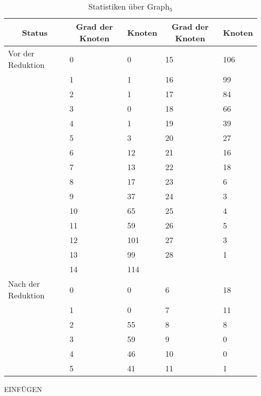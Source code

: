 \begin{table}[htb]
\caption{Statistiken über Graph$_{5}$\label{tab:graph4}}
\vspace*{1em}
\centering

\bgroup
\def\arraystretch{1.3}%

\begin{threeparttable}

\begin{tabular}[c]{ l | l | l | | l | l}
	
	\multicolumn{1}{c|}{\textbf{Status}} & 
	\multicolumn{1}{c|}{\textbf{Grad der Knoten}} & 
	\multicolumn{1}{c||}{\textbf{Knoten}} &
	\multicolumn{1}{c|}{\textbf{Grad der Knoten}} & 
	\multicolumn{1}{c}{\textbf{Knoten}}\\
	
	\hline
		
	Vor der Reduktion & 0 & 0 &15  & 106 \\
	& 1 & 1 & 16&99 \\
	& 2 & 1 & 17& 84\\
	& 3 & 0 & 18& 66\\
	& 4 & 1 & 19& 39\\
	& 5 & 3 & 20& 27\\
	& 6 & 12 & 21& 16\\
	& 7 & 13 & 22& 18\\
	&  8& 17 & 23& 6\\
	&  9& 37 & 24& 3\\
	&  10& 65 & 25& 4\\
	&  11& 59 & 26& 5\\
	&  12& 101 & 27& 3\\
	&  13& 99 & 28& 1\\
	&  14& 114 & & \\
	
	\hline

	Nach der Reduktion & 0 & 0 & 6 & 18 \\
	& 1 & 0 & 7 & 11 \\
	& 2 & 55 & 8 & 8 \\
	& 3 & 59 & 9 & 0 \\
	& 4 & 46 & 10 & 0 \\
	& 5 & 41 & 11 & 1 \\
	
	
\end{tabular}
\begin{tablenotes}\footnotesize
\item EINFÜGEN
\end{tablenotes}

\end{threeparttable}

\egroup

\end{table}

